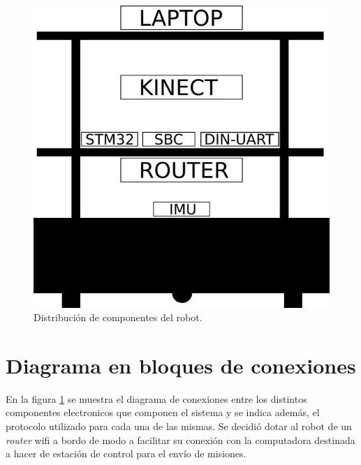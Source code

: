\begin{figure}[ht]
  \centering
  \includegraphics[scale=0.4]{./Figures/distribucion_componentes.png}
  \caption{Distribución de componentes del robot.}
  \label{fig:lubobotComponentes}
\end{figure}

\section{Diagrama en bloques de conexiones}

En la figura \ref{fig:lubobotComponentes} se muestra el diagrama de conexiones entre los distintos componentes electronicos que componen el sistema y se indica además, el protocolo utilizado para cada una de las mismas. Se decidió dotar al robot de un \textit{router} wifi a bordo de modo a facilitar su conexión con la computadora destinada a hacer de estación de control para el envío de misiones.

